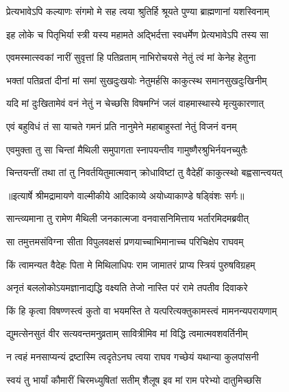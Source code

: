 \twolineshloka
{प्रेत्यभावेऽपि कल्याणः संगमो मे सह त्वया}
{श्रुतिर्हि श्रूयते पुण्या ब्राह्मणानां यशस्विनाम्} %

\twolineshloka
{इह लोके च पितृभिर्या स्त्री यस्य महामते}
{अद्भिर्दत्ता स्वधर्मेण प्रेत्यभावेऽपि तस्य सा} %

\twolineshloka
{एवमस्मात्स्वकां नारीं सुवृत्तां हि पतिव्रताम्}
{नाभिरोचयसे नेतुं त्वं मां केनेह हेतुना} %

\twolineshloka
{भक्तां पतिव्रतां दीनां मां समां सुखदुःखयोः}
{नेतुमर्हसि काकुत्स्थ समानसुखदुःखिनीम्} %

\twolineshloka
{यदि मां दुःखितामेवं वनं नेतुं न चेच्छसि}
{विषमग्निं जलं वाहमास्थास्ये मृत्युकारणात्} %

\twolineshloka
{एवं बहुविधं तं सा याचते गमनं प्रति}
{नानुमेने महाबाहुस्तां नेतुं विजनं वनम्} %

\twolineshloka
{एवमुक्ता तु सा चिन्तां मैथिली समुपागता}
{स्नापयन्तीव गामुष्णैरश्रुभिर्नयनच्युतैः} %

\twolineshloka
{चिन्तयन्तीं तथा तां तु निवर्तयितुमात्मवान्}
{क्रोधाविष्टां तु वैदेहीं काकुत्स्थो बह्वसान्त्वयत्} %


{॥इत्यार्षे श्रीमद्रामायणे वाल्मीकीये आदिकाव्ये अयोध्याकाण्डे षड्विंशः सर्गः॥}


\twolineshloka
{सान्त्व्यमाना तु रामेण मैथिली जनकात्मजा}
{वनवासनिमित्ताय भर्तारमिदमब्रवीत्} %

\twolineshloka
{सा तमुत्तमसंविग्ना सीता विपुलवक्षसं}
{प्रणयाच्चाभिमानाच्च परिचिक्षेप राघवम्} %

\twolineshloka
{किं त्वामन्यत वैदेहः पिता मे मिथिलाधिपः}
{राम जामातरं प्राप्य स्त्रियं पुरुषविग्रहम्} %

\twolineshloka
{अनृतं बललोकोऽयमज्ञानाद्यद्धि वक्ष्यति}
{तेजो नास्ति परं रामे तपतीव दिवाकरे} %

\twolineshloka
{किं हि कृत्वा विषण्णस्त्वं कुतो वा भयमस्ति ते}
{यत्परित्यक्तुकामस्त्वं मामनन्यपरायणाम्} %

\twolineshloka
{द्युमत्सेनसुतं वीर सत्यवन्तमनुव्रताम्}
{सावित्रीमिव मां विद्धि त्वमात्मवशवर्तिनीम्} %

\twolineshloka
{न त्वहं मनसाप्यन्यं द्रष्टास्मि त्वदृतेऽनघ}
{त्वया राघव गच्छेयं यथान्या कुलपांसनी} %

\twolineshloka
{स्वयं तु भार्यां कौमारीं चिरमध्युषितां सतीम्}
{शैलूष इव मां राम परेभ्यो दातुमिच्छसि} %

